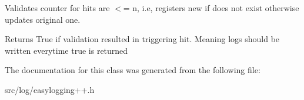 Validates counter for hits are $<$= n, i.\+e, registers new if does not exist otherwise updates original one. 

\begin{DoxyReturn}{Returns}
True if validation resulted in triggering hit. Meaning logs should be written everytime true is returned 
\end{DoxyReturn}


The documentation for this class was generated from the following file\+:\begin{DoxyCompactItemize}
\item 
src/log/easylogging++.\+h\end{DoxyCompactItemize}
